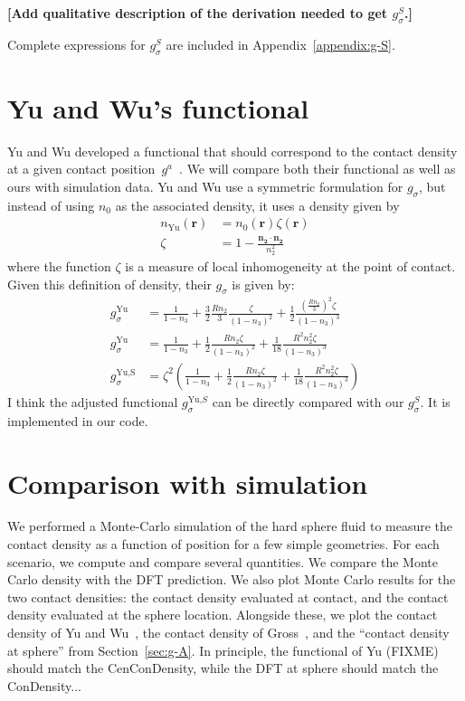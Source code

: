 \documentclass[letterpaper,twocolumn,amsmath,amssymb,jcp,10pt,aip]{revtex4-1}
\newcommand{\red}[1]{{\bf \color{red} #1}}
\newcommand{\rr}{\textbf{r}}
\newcommand{\fixme}[1]{\red{[#1]}}
\begin{document}
\fixme{Add qualitative description of the derivation needed to get
  $g_\sigma^S$.}

Complete expressions for $g_\sigma^S$ are included in
Appendix~\ref{appendix:g-S}.

\section{Yu and Wu's functional}\label{sec:yuwu}

Yu and Wu developed a functional that should correspond to the contact
density at a given contact
position~$g^a$~\cite{yu2002fmt-dft-inhomogeneous-associating}.  We
will compare both their functional as well as ours with simulation
data.  Yu and Wu use a symmetric formulation for $g_\sigma$, but
instead of using $n_0$ as the associated density, it uses a density
given by
\begin{align}
  n_\text{Yu}(\rr) &= n_0(\rr) \zeta(\rr) \\
  \zeta &= 1 - \frac{\mathbf{n_2}\cdot\mathbf{n_2}}{n_2^2}
\end{align}
where the function $\zeta$ is a measure of local inhomogeneity at the
point of contact.  Given this definition of density, their $g_\sigma$ is
given by:
\begin{align}
  g_\sigma^\text{Yu} &= \frac{1}{1-n_3}
    + \frac32 \frac{R n_2}{3}\frac{\zeta}{(1-n_3)^2}
    + \frac12 \frac{\left(\frac{R n_2}{3}\right)^2 \zeta}{(1-n_3)^3}
    \\
  g_\sigma^\text{Yu} &= \frac{1}{1-n_3}
    + \frac12 \frac{R n_2\zeta}{(1-n_3)^2}
    + \frac1{18} \frac{R^2 n_2^2 \zeta}{(1-n_3)^3}
    \\
  g_\sigma^\text{Yu,S} &= \zeta^2\left(\frac{1}{1-n_3}
    + \frac12 \frac{R n_2\zeta}{(1-n_3)^2}
    + \frac1{18} \frac{R^2 n_2^2 \zeta}{(1-n_3)^3}\right)
\end{align}
I think the adjusted functional $g_\sigma^{\text{Yu,}S}$ can be directly
compared with our $g_\sigma^S$.  It is implemented in our code.

\section{Comparison with simulation}

We performed a Monte-Carlo simulation of the hard sphere fluid to
measure the contact density as a function of position for a few simple
geometries.  For each scenario, we compute and compare several
quantities.  We compare the Monte Carlo density with the DFT
prediction.  We also plot Monte Carlo results for the two contact
densities: the contact density evaluated at contact, and the contact
density evaluated at the sphere location.  Alongside these, we plot
the contact density of Yu and
Wu~\cite{yu2002fmt-dft-inhomogeneous-associating}, the contact density
of Gross~\cite{gross2009density}, and the ``contact density at
sphere'' from Section~\ref{sec:g-A}.  In principle, the
functional of Yu (FIXME) should match the CenConDensity, while the DFT
at sphere should match the ConDensity...
\end{document}
